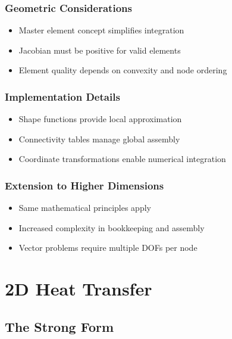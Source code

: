 \documentclass[
  11pt,
  a4paper,
]{scrbook}
\providecommand{\tightlist}{%
  \setlength{\itemsep}{0pt}\setlength{\parskip}{0pt}}\usepackage{longtable,booktabs,array}
\begin{document}
\subsection{Geometric Considerations}\label{geometric-considerations}

\begin{itemize}
\tightlist
\item
  Master element concept simplifies integration
\item
  Jacobian must be positive for valid elements
\item
  Element quality depends on convexity and node ordering
\end{itemize}

\subsection{Implementation Details}\label{implementation-details}

\begin{itemize}
\tightlist
\item
  Shape functions provide local approximation
\item
  Connectivity tables manage global assembly
\item
  Coordinate transformations enable numerical integration
\end{itemize}

\subsection{Extension to Higher
Dimensions}\label{extension-to-higher-dimensions}

\begin{itemize}
\tightlist
\item
  Same mathematical principles apply
\item
  Increased complexity in bookkeeping and assembly
\item
  Vector problems require multiple DOFs per node
\end{itemize}

\chapter{2D Heat Transfer}\label{d-heat-transfer}

\section{The Strong Form}\label{the-strong-form-1}
\end{document}
